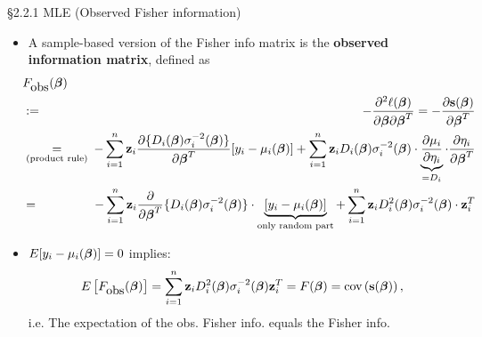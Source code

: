 \documentclass{beamer}
\begin{document}
\begin{frame}{\S2.2.1 MLE (Observed Fisher information)}
\begin{itemize}
\item A sample-based version of the Fisher info matrix is the {\bf observed information matrix}, defined as
 {\footnotesize
\begin{eqnarray*}
& \!\!\! F_{\mbox{obs}}(\mbox{\boldmath $\beta$})& \\
& \!\!\!:= \!\!\!& -\frac{\partial^2\ell(\mbox{\boldmath $\beta$})}{
\partial \mbox{\boldmath $\beta$}\partial \mbox{\boldmath $\beta$}^T}=
-\frac{\partial \textbf{s}(\mbox{\boldmath $\beta$})}{\partial \mbox{\boldmath $\beta$}^T} \\
& \!\!\!\underset{\text{(product rule)}}{ =} \!\!\!& -\sum_{i=1}^n \textbf{z}_i \frac{\partial \{D_i(\mbox{\boldmath $\beta$})\sigma_i^{-2}(
\mbox{\boldmath $\beta$})\} }{\partial \mbox{\boldmath $\beta$}^T}[y_i-\mu_i(\mbox{\boldmath $\beta$})]
+\sum_{i=1}^n \textbf{z}_i D_i(\mbox{\boldmath $\beta$})\sigma_i^{-2}(\mbox{\boldmath $\beta$}) \cdot
\underbrace{\frac{\partial\mu_i}{\partial \eta_i}}_{= D_i}\cdot \frac{\partial\eta_i}{\partial \mbox{\boldmath $\beta$}^T} \\
& \!\!\!= \!\!\!& -\sum_{i=1}^n \textbf{z}_i \frac{\partial}{\partial \mbox{\boldmath $\beta$}^T}
\{D_i(\mbox{\boldmath $\beta$})\sigma_i^{-2}(\mbox{\boldmath $\beta$})\}\cdot
\underbrace{[y_i-\mu_i(\mbox{\boldmath $\beta$})] }_{\text{only random part}}+\sum_{i=1}^n \textbf{z}_i D_i^2(\mbox{\boldmath $\beta$})
\sigma_i^{-2}(\mbox{\boldmath $\beta$}) \cdot \textbf{z}_i^T
\end{eqnarray*}}
\item $E[y_i-\mu_i(\mbox{\boldmath $\beta$})] = 0$ implies:
\[E\left[F_{\mbox{obs}}(\mbox{\boldmath $\beta$})\right]=\sum_{i=1}^n \textbf{z}_i 
D_i^2(\mbox{\boldmath $\beta$})\sigma_i^{-2}(\mbox{\boldmath $\beta$}) \textbf{z}_i^T
=F(\mbox{\boldmath $\beta$})=\mbox{cov}\left(\textbf{s}(\mbox{\boldmath $\beta$})\right), \]
i.e.  The expectation of the obs. Fisher info. equals the Fisher info.
\end{itemize}
\end{frame}
\end{document}
